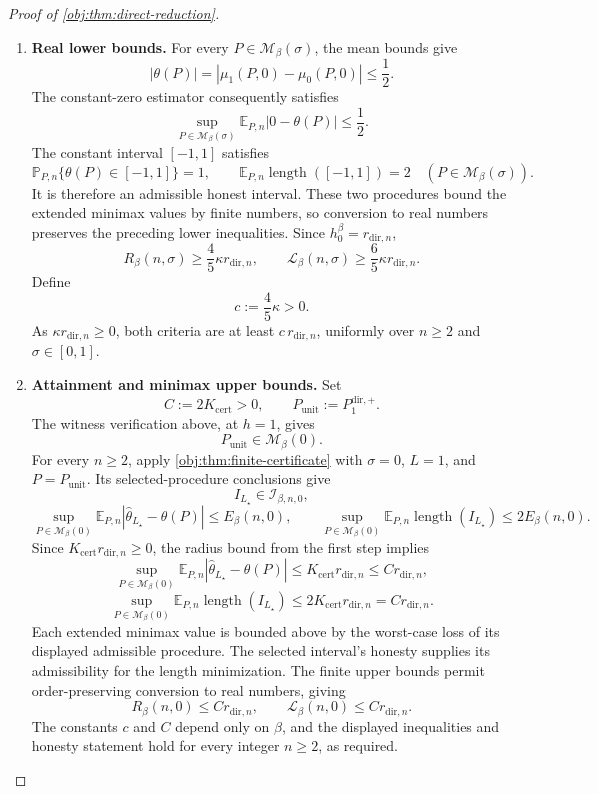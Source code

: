 \begin{proof}[Proof of \cref{obj:thm:direct-reduction}]
\begin{enumerate}
\item \textbf{Real lower bounds.}
For every \(P\in\mathcal M_\beta(\sigma)\), the mean bounds give
\[
|\theta(P)|
=|\mu_1(P,0)-\mu_0(P,0)|
\le\frac12.
\]
The constant-zero estimator consequently satisfies
\[
\sup_{P\in\mathcal M_\beta(\sigma)}
\mathbb E_{P,n}|0-\theta(P)|\le\frac12.
\]
The constant interval \([-1,1]\) satisfies
\[
\mathbb P_{P,n}\{\theta(P)\in[-1,1]\}=1,
\qquad
\mathbb E_{P,n}\operatorname{length}([-1,1])=2
\quad(P\in\mathcal M_\beta(\sigma)).
\]
It is therefore an admissible honest interval. These two procedures bound the extended minimax values by finite numbers, so conversion to real numbers preserves the preceding lower inequalities. Since \(h_0^\beta=r_{\mathrm{dir},n}\),
\[
R_\beta(n,\sigma)\ge\frac45\kappa r_{\mathrm{dir},n},
\qquad
\mathcal L_\beta(n,\sigma)\ge\frac65\kappa r_{\mathrm{dir},n}.
\]
Define
\[
c:=\frac45\kappa>0.
\]
As \(\kappa r_{\mathrm{dir},n}\ge0\), both criteria are at least
\(c\,r_{\mathrm{dir},n}\), uniformly over \(n\ge2\) and \(\sigma\in[0,1]\).

\item \textbf{Attainment and minimax upper bounds.}
Set
\[
C:=2K_{\mathrm{cert}}>0,
\qquad
P_{\mathrm{unit}}:=P_1^{\mathrm{dir},+}.
\]
The witness verification above, at \(h=1\), gives
\[
P_{\mathrm{unit}}\in\mathcal M_\beta(0).
\]
For every \(n\ge2\), apply \cref{obj:thm:finite-certificate} with
\(\sigma=0\), \(L=1\), and \(P=P_{\mathrm{unit}}\). Its selected-procedure conclusions give
\[
I_{L_\star}\in\mathcal I_{\beta,n,0},
\]
\[
\sup_{P\in\mathcal M_\beta(0)}
\mathbb E_{P,n}
|\widehat\theta_{L_\star}-\theta(P)|
\le E_\beta(n,0),
\qquad
\sup_{P\in\mathcal M_\beta(0)}
\mathbb E_{P,n}\operatorname{length}(I_{L_\star})
\le2E_\beta(n,0).
\]
Since \(K_{\mathrm{cert}}r_{\mathrm{dir},n}\ge0\), the radius bound from the first step implies
\[
\sup_{P\in\mathcal M_\beta(0)}
\mathbb E_{P,n}
|\widehat\theta_{L_\star}-\theta(P)|
\le K_{\mathrm{cert}}r_{\mathrm{dir},n}
\le C r_{\mathrm{dir},n},
\]
\[
\sup_{P\in\mathcal M_\beta(0)}
\mathbb E_{P,n}\operatorname{length}(I_{L_\star})
\le2K_{\mathrm{cert}}r_{\mathrm{dir},n}
=C r_{\mathrm{dir},n}.
\]
Each extended minimax value is bounded above by the worst-case loss of its displayed admissible procedure. The selected interval's honesty supplies its admissibility for the length minimization. The finite upper bounds permit order-preserving conversion to real numbers, giving
\[
R_\beta(n,0)\le C r_{\mathrm{dir},n},
\qquad
\mathcal L_\beta(n,0)\le C r_{\mathrm{dir},n}.
\]
The constants \(c\) and \(C\) depend only on \(\beta\), and the displayed inequalities and honesty statement hold for every integer \(n\ge2\), as required.
\end{enumerate}
\end{proof}

